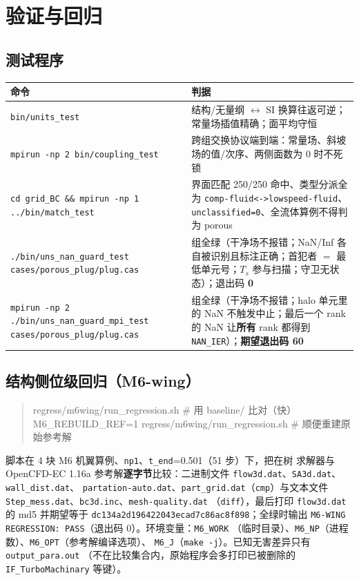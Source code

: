 \documentclass[11pt,a4paper]{ctexart}
\begin{document}
\section{验证与回归}\label{sec:regress}

\subsection{测试程序}

\begin{center}\small
\begin{tabular}{@{}>{\raggedright\arraybackslash}p{}>{\raggedright\arraybackslash}p{}@{}}
\toprule
命令 & 判据 \\
\midrule
\texttt{bin/units\_test} & 结构/无量纲 $\leftrightarrow$ SI 换算往返可逆；常量场插值精确；面平均守恒 \\
\texttt{mpirun -np 2 bin/coupling\_test} & 跨组交换协议端到端：常量场、斜坡场的值/次序、两侧面数为 0 时不死锁 \\
\texttt{cd grid\_BC \&\& mpirun -np 1 ../bin/match\_test} & 界面匹配 250/250 命中、类型分派全为 \texttt{comp-fluid<->lowspeed-fluid}、\texttt{unclassified=0}、全流体算例不得判为 porous \\
\texttt{./bin/uns\_nan\_guard\_test cases/porous\_plug/plug.cas} & 6 组全绿（干净场不报错；NaN/Inf 各自被识别且标注正确；首犯者 $=$ 最低单元号；$T_s$ 参与扫描；守卫无状态）；退出码 \textbf{0} \\
\texttt{mpirun -np 2 ./bin/uns\_nan\_guard\_mpi\_test cases/porous\_plug/plug.cas} & 3 组全绿（干净场不报错；halo 单元里的 NaN 不触发中止；最后一个 rank 的 NaN 让\textbf{所有} rank 都得到 \texttt{NAN\_IER}）；\textbf{期望退出码 60} \\
\bottomrule
\end{tabular}
\end{center}

\subsection{结构侧位级回归（M6-wing）}

\begin{quote}\ttfamily\small
regress/m6wing/run\_regression.sh \phantom{xxxx}\# 用 baseline/ 比对（快）\\
M6\_REBUILD\_REF=1 regress/m6wing/run\_regression.sh \phantom{x}\# 顺便重建原始参考解
\end{quote}

脚本在 4 块 M6 机翼算例、\texttt{np1}、\texttt{t\_end}=0.501（51 步）下，把在树
求解器与 OpenCFD-EC 1.16a 参考解\textbf{逐字节}比较：二进制文件
\texttt{flow3d.dat}、\texttt{SA3d.dat}、\texttt{wall\_dist.dat}、
\texttt{partation-auto.dat}、\texttt{part\_grid.dat}（\texttt{cmp}）与文本文件
\texttt{Step\_mess.dat}、\texttt{bc3d.inc}、\texttt{mesh-quality.dat}
（\texttt{diff}），最后打印 \texttt{flow3d.dat} 的 md5 并期望等于
\texttt{dc134a2d196422043ecad7c86ac8f898}；全绿时输出
\texttt{M6-WING REGRESSION: PASS}（退出码 0）。环境变量：\texttt{M6\_WORK}
（临时目录）、\texttt{M6\_NP}（进程数）、\texttt{M6\_OPT}（参考解编译选项）、
\texttt{M6\_J}（\texttt{make -j}）。已知无害差异只有 \texttt{output\_para.out}
（不在比较集合内，原始程序会多打印已被删除的 \texttt{IF\_TurboMachinary} 等键）。
\end{document}
